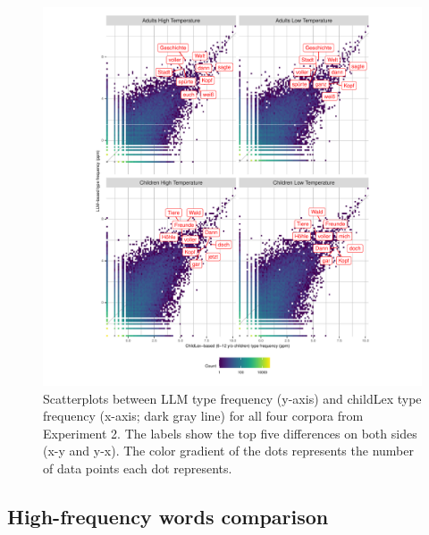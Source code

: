 \documentclass[doc, a4paper, anonymous]{apa7}
\begin{document}
\begin{figure}[!htbp]
    \includegraphics[width = 0.8\paperwidth]{figures/scatterplotfacets.pdf}
    \caption{Scatterplots between LLM type frequency (y-axis) and childLex type frequency (x-axis; dark gray line) for all four corpora from Experiment 2. The labels show the top five differences on both sides (x-y and y-x). The color gradient of the dots represents the number of data points each dot represents.}
    \label{fig:scatterplotfacets}
\end{figure}

\clearpage


\subsection{High-frequency words comparison}
\end{document}
